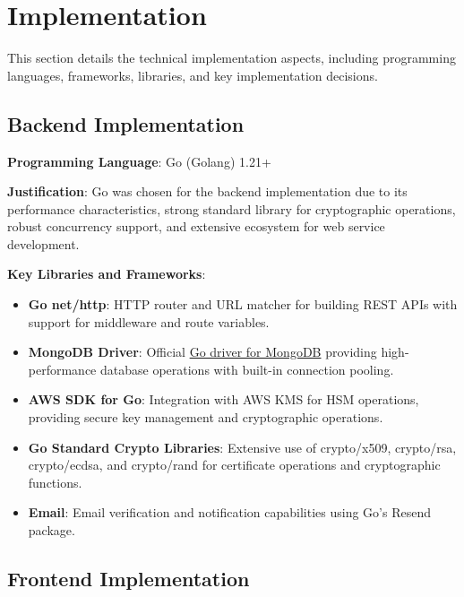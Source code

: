 \section{Implementation}

This section details the technical implementation aspects, including programming languages, frameworks, libraries, and key implementation decisions.

\subsection{Backend Implementation}

\textbf{Programming Language}: Go (Golang) 1.21+

\textbf{Justification}: Go was chosen for the backend implementation due to its performance characteristics, strong standard library for cryptographic operations, robust concurrency support, and extensive ecosystem for web service development.

\textbf{Key Libraries and Frameworks}:

\begin{itemize}
    \item \textbf{Go net/http}: HTTP router and URL matcher for building REST APIs with support for middleware and route variables.
    
    \item \textbf{MongoDB Driver}: Official \href{go.mongodb.org/mongo-driver/v2}{Go driver for MongoDB} providing high-performance database operations with built-in connection pooling.
    
    \item \textbf{AWS SDK for Go}: Integration with AWS KMS for HSM operations, providing secure key management and cryptographic operations.
    
    \item \textbf{Go Standard Crypto Libraries}: Extensive use of crypto/x509, crypto/rsa, crypto/ecdsa, and crypto/rand for certificate operations and cryptographic functions.
    
    \item \textbf{Email}: Email verification and notification capabilities using Go's Resend package.
\end{itemize}

\subsection{Frontend Implementation}

